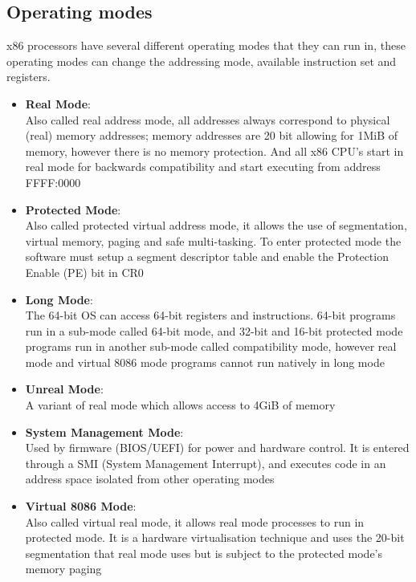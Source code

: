 \documentclass{article}
\newcommand{\layout}[1]{\parbox{\linewidth}{#1}}
\begin{document}

\layout{
  \subsection{Operating modes}

  x86 processors have several different operating modes that they can run in, these operating modes can change the addressing mode, available instruction set and registers.

  \begin{itemize}
    \item \textbf{Real Mode\cite{mode-real}}: \\
      Also called real address mode, all addresses always correspond to physical (real) memory addresses; memory addresses are 20 bit allowing for 1MiB of memory, however there is no memory protection.
      And all x86 CPU's start in real mode for backwards compatibility and start executing from address FFFF:0000
    \item \textbf{Protected Mode\cite{mode-protected}}: \\
      Also called protected virtual address mode, it allows the use of segmentation, virtual memory, paging and safe multi-tasking.
      To enter protected mode the software must setup a segment descriptor table and enable the Protection Enable (PE) bit in CR0
    \item \textbf{Long Mode\cite{mode-long}}: \\
      The 64-bit OS can access 64-bit registers and instructions.
      64-bit programs run in a sub-mode called 64-bit mode, and 32-bit and 16-bit protected mode programs run in another sub-mode called compatibility mode, however real mode and virtual 8086 mode programs cannot run natively in long mode
    \item \textbf{Unreal Mode\cite{mode-unreal}}: \\
      A variant of real mode which allows access to 4GiB of memory
    \item \textbf{System Management Mode\cite{mode-smm}}: \\
      Used by firmware (BIOS/UEFI) for power and hardware control.
      It is entered through a SMI (System Management Interrupt), and executes code in an address space isolated from other operating modes
    \item \textbf{Virtual 8086 Mode\cite{mode-virt8086}}: \\
      Also called virtual real mode, it allows real mode processes to run in protected mode. It is a hardware virtualisation technique and uses the 20-bit segmentation that real mode uses but is subject to the protected mode's memory paging
  \end{itemize}
}
\end{document}
